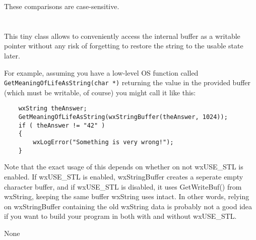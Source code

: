






These comparisons are case-sensitive.


\section{}\label{wxstringbuffer}

This tiny class allows to conveniently access the  
internal buffer as a writable pointer without any risk of forgetting to restore
the string to the usable state later.

For example, assuming you have a low-level OS function called 
{\tt GetMeaningOfLifeAsString(char *)} returning the value in the provided
buffer (which must be writable, of course) you might call it like this:

\begin{verbatim}
    wxString theAnswer;
    GetMeaningOfLifeAsString(wxStringBuffer(theAnswer, 1024));
    if ( theAnswer != "42" )
    {
        wxLogError("Something is very wrong!");
    }
\end{verbatim}

Note that the exact usage of this depends on whether on not wxUSE\_STL is enabled.  If
wxUSE\_STL is enabled, wxStringBuffer creates a seperate empty character buffer, and
if wxUSE\_STL is disabled, it uses GetWriteBuf() from wxString, keeping the same buffer
wxString uses intact.  In other words, relying on wxStringBuffer containing the old 
wxString data is probably not a good idea if you want to build your program in both
with and without wxUSE\_STL.


None


